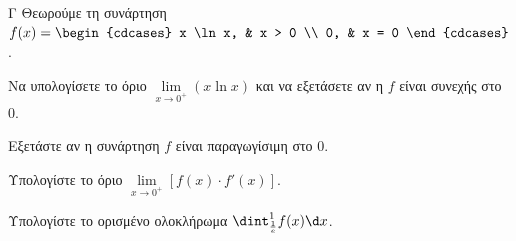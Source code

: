 \begin{thema}{Γ}
Θεωρούμε τη συνάρτηση $f(x) = \begin{cdcases} x \ln x, & x > 0 \\ 0, & x = 0 \end{cdcases}$.
\begin{erwthma}
  \item Να υπολογίσετε το όριο $\lim\limits_{x\to 0^+} (x \ln x)$ και να εξετάσετε αν η $f$ είναι συνεχής στο $0$.
  \item Εξετάστε αν η συνάρτηση $f$ είναι παραγωγίσιμη στο $0$.
  \item Υπολογίστε το όριο $\lim\limits_{x \to 0^+} [ f(x) \cdot f'(x) ]$.
  \item Υπολογίστε το ορισμένο ολοκλήρωμα $\dint_{\frac{1}{e}}^1 f(x)\d x$.
\end{erwthma}
\end{thema}
